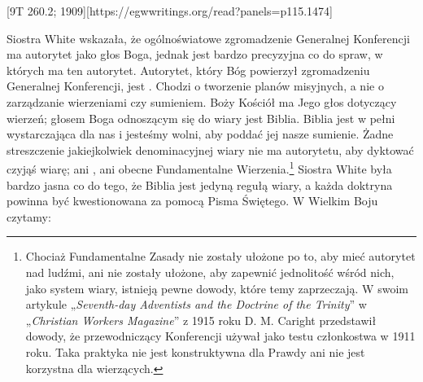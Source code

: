 [9T 260.2; 1909][https://egwwritings.org/read?panels=p115.1474]

Siostra White wskazała, że ogólnoświatowe zgromadzenie Generalnej Konferencji ma autorytet jako głos Boga, jednak jest bardzo precyzyjna co do spraw, w których ma ten autorytet. Autorytet, który Bóg powierzył zgromadzeniu Generalnej Konferencji, jest . Chodzi o tworzenie planów misyjnych, a nie o zarządzanie wierzeniami czy sumieniem. Boży Kościół ma Jego głos dotyczący wierzeń; głosem Boga odnoszącym się do wiary jest Biblia. Biblia jest w pełni wystarczająca dla nas i jesteśmy wolni, aby poddać jej nasze sumienie. Żadne streszczenie jakiejkolwiek denominacyjnej wiary nie ma autorytetu, aby dyktować czyjąś wiarę; ani , ani obecne Fundamentalne Wierzenia.\footnote{Chociaż Fundamentalne Zasady nie zostały ułożone po to, aby mieć autorytet nad ludźmi, ani nie zostały ułożone, aby zapewnić jednolitość wśród nich, jako system wiary, istnieją pewne dowody, które temy zaprzeczają. W swoim artykule „\textit{Seventh-day Adventists and the Doctrine of the Trinity}” w „\textit{Christian Workers Magazine}” z 1915 roku D. M. Caright przedstawił dowody, że przewodniczący Konferencji używał  jako testu członkostwa w 1911 roku. Taka praktyka nie jest konstruktywna dla Prawdy ani nie jest korzystna dla wierzących.} Siostra White była bardzo jasna co do tego, że Biblia jest jedyną regułą wiary, a każda doktryna powinna być kwestionowana za pomocą Pisma Świętego. W Wielkim Boju czytamy:

